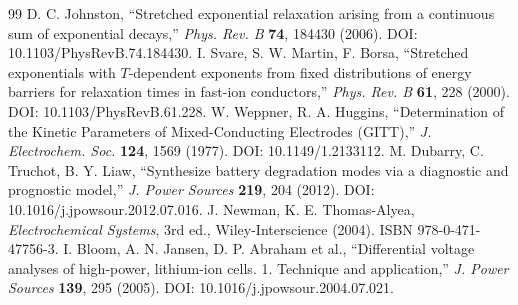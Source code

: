 \documentclass[11pt,a4paper]{article}
\begin{document}
\begin{thebibliography}{99}
 D. C. Johnston, ``Stretched exponential relaxation arising from a continuous sum of exponential decays,'' \emph{Phys. Rev. B} \textbf{74}, 184430 (2006). DOI: 10.1103/PhysRevB.74.184430.
 I. Svare, S. W. Martin, F. Borsa, ``Stretched exponentials with $T$-dependent exponents from fixed distributions of energy barriers for relaxation times in fast-ion conductors,'' \emph{Phys. Rev. B} \textbf{61}, 228 (2000). DOI: 10.1103/PhysRevB.61.228.
 W. Weppner, R. A. Huggins, ``Determination of the Kinetic Parameters of Mixed-Conducting Electrodes (GITT),'' \emph{J. Electrochem. Soc.} \textbf{124}, 1569 (1977). DOI: 10.1149/1.2133112.
 M. Dubarry, C. Truchot, B. Y. Liaw, ``Synthesize battery degradation modes via a diagnostic and prognostic model,'' \emph{J. Power Sources} \textbf{219}, 204 (2012). DOI: 10.1016/j.jpowsour.2012.07.016.
 J. Newman, K. E. Thomas-Alyea, \emph{Electrochemical Systems}, 3rd ed., Wiley-Interscience (2004). ISBN 978-0-471-47756-3.
 I. Bloom, A. N. Jansen, D. P. Abraham et al., ``Differential voltage analyses of high-power, lithium-ion cells. 1. Technique and application,'' \emph{J. Power Sources} \textbf{139}, 295 (2005). DOI: 10.1016/j.jpowsour.2004.07.021.
\end{thebibliography}
\end{document}
